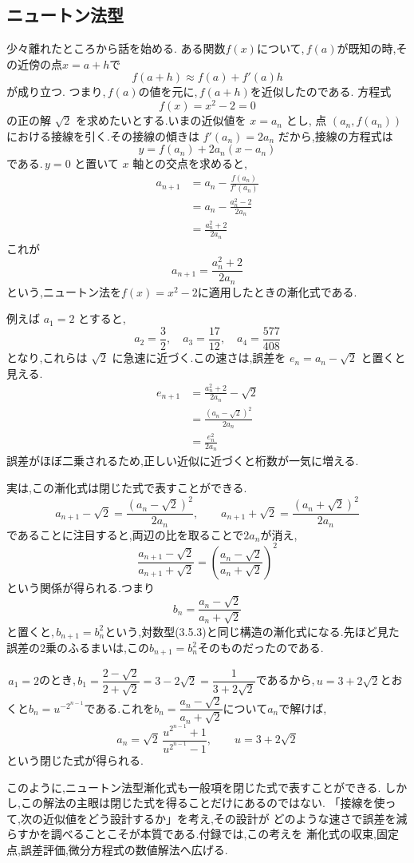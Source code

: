 \subsection{ニュートン法型}

少々離れたところから話を始める.
ある関数$f(x)$について,\,$f(a)$が既知の時,その近傍の点$x=a+h$で
\[
  f(a+h) \approx f(a)+f'(a)h
\]
が成り立つ.
つまり,\,$f(a)$の値を元に,\,$f(a+h)$を近似したのである.
方程式
\[
  f(x)=x^2-2=0
\]
の正の解 $\sqrt{2}$ を求めたいとする.いまの近似値を $x=a_n$ とし,
点 $(a_n,f(a_n))$ における接線を引く.その接線の傾きは
$f'(a_n)=2a_n$ だから,接線の方程式は
\[
  y=f(a_n)+2a_n(x-a_n)
\]
である.\,$y=0$ と置いて $x$ 軸との交点を求めると,
\begin{align*}
  a_{n+1}
    &=a_n-\frac{f(a_n)}{f'(a_n)}\\
    &=a_n-\frac{a_n^2-2}{2a_n}\\
    &=\frac{a_n^2+2}{2a_n}
\end{align*}
これが
\[
  a_{n+1}=\frac{a_n^2+2}{2a_n}
\]
という,ニュートン法を$f(x)=x^2-2$に適用したときの漸化式である.

例えば $a_1=2$ とすると,
\[
  a_2=\frac{3}{2},
  \quad
  a_3=\frac{17}{12},
  \quad
  a_4=\frac{577}{408}
\]
となり,これらは $\sqrt{2}$ に急速に近づく.この速さは,誤差を
$e_n=a_n-\sqrt{2}$ と置くと見える.
\begin{align*}
  e_{n+1}
    &=\frac{a_n^2+2}{2a_n}-\sqrt{2}\\
    &=\frac{(a_n-\sqrt{2})^2}{2a_n}\\
    &=\frac{e_n^2}{2a_n}
\end{align*}
誤差がほぼ二乗されるため,正しい近似に近づくと桁数が一気に増える.

実は,この漸化式は閉じた式で表すことができる.
\[
  a_{n+1}-\sqrt{2}=\frac{(a_n-\sqrt{2})^2}{2a_n},
  \qquad
  a_{n+1}+\sqrt{2}=\frac{(a_n+\sqrt{2})^2}{2a_n}
\]
であることに注目すると,両辺の比を取ることで$2a_n$が消え,
\[
  \frac{a_{n+1}-\sqrt{2}}{a_{n+1}+\sqrt{2}}
  =\left(\frac{a_n-\sqrt{2}}{a_n+\sqrt{2}}\right)^{2}
\]
という関係が得られる.つまり
\[
  b_n=\frac{a_n-\sqrt{2}}{a_n+\sqrt{2}}
\]
と置くと,\,$b_{n+1}=b_n^{2}$という,対数型(3.5.3)と同じ構造の漸化式になる.先ほど見た誤差の2乗のふるまいは,この$b_{n+1}=b_n^2$そのものだったのである.

\,$a_1=2$のとき,\,$b_1=\dfrac{2-\sqrt2}{2+\sqrt2}=3-2\sqrt2=\dfrac1{3+2\sqrt2}$であるから,\,$u=3+2\sqrt2$とおくと$b_n=u^{-2^{n-1}}$である.これを$b_n=\dfrac{a_n-\sqrt2}{a_n+\sqrt2}$について$a_n$で解けば,
\[
  a_n=\sqrt{2}\,\frac{u^{2^{n-1}}+1}{u^{2^{n-1}}-1},\qquad u=3+2\sqrt2
\]
という閉じた式が得られる.

このように,ニュートン法型漸化式も一般項を閉じた式で表すことができる.
しかし,この解法の主眼は閉じた式を得ることだけにあるのではない.
「接線を使って,次の近似値をどう設計するか」を考え,その設計が
どのような速さで誤差を減らすかを調べることこそが本質である.付録では,この考えを
漸化式の収束,固定点,誤差評価,微分方程式の数値解法へ広げる.
